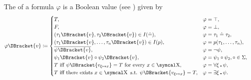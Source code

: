 \begin{definition}
\begin{DefEnum}
     The  of a formula \( \varphi \) is a Boolean value (see ) given by
    \begin{equation}\label{eq:def:first_order_valuation/formula_valuation}
      \varphi\DBracket{v} \coloneqq \begin{cases}
        T,                                                                              &\varphi = \top, \\
        F,                                                                              &\varphi = \bot, \\
        (\tau_1\DBracket{v}, \tau_2\DBracket{v}) \in I(\doteq),                         &\varphi = \tau_1 \doteq \tau_2, \\
        (\tau_1\DBracket{v}, \ldots, \tau_n\DBracket{v}) \in I(p),                      &\varphi = p(\tau_1, \ldots, \tau_n), \\
        \Ol{\psi\DBracket{v}},                                                          &\varphi = \neg \psi, \\
        \psi_1\DBracket{v} \circ \psi_2\DBracket{v},                                    &\varphi = \psi_1 \circ \psi_2, \circ \in \Sigma, \\
        T \T{iff} \psi\DBracket{v_{\xi \mapsto x}} = T \T{for every} x \in \CX,         &\varphi = \forall \xi \centerdot \psi, \\
        T \T{iff there exists} x \in \CX \T{s.t.} \psi\DBracket{v_{\xi \mapsto x}} = T, &\varphi = \exists \xi \centerdot \psi.
      \end{cases}
    \end{equation}
  \end{DefEnum}
\end{definition}

